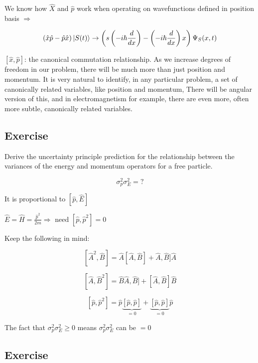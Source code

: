\documentclass{article}
\begin{document}
We know how $\hat{X}$ and $\hat{p}$ work when operating on wavefunctions defined in position basis $\Longrightarrow$

$$\left( \hat{x} \hat{p} - \hat{p} \hat{x} \right) \ket{S(t)} \rightarrow \left( s \left( -i \hbar \frac{d}{dx} \right) - \left(- i \hbar \frac{d}{dx} \right) x \right) \Psi_S(x,t)$$

$[\hat{x}, \hat{p}]$: the canonical commutation relationship. As we increase degrees of freedom in our problem, there will be much more than just position and momentum. It is very natural to identify, in any particular problem, a set of canonically related variables, like position and momentum, There will be angular version of this, and in electromagnetism for example, there are even more, often more subtle, canonically related variables. 




\subsection{Exercise}

Derive the uncertainty principle prediction for the relationship between the variances of the energy and momentum operators for a free particle. 

$$\sigma_p^2 \sigma_E^2 = ?$$

It is proportional to $[\hat{p}, \hat{E}]$

$\hat{E} = \hat{H} = \frac{\hat{p}^2}{2m} \Rightarrow \text{ need } [\hat{p}, \hat{p}^2] = 0$

Keep the following in mind:

$$[\hat{A}^2, \hat{B}] = \hat{A} [\hat{A}, \hat{B}] + \hat{A}, \hat{B}] \hat{A}$$

$$[\hat{A}, \hat{B}^2] = \hat{B} \hat{A}, \hat{B}] + [\hat{A}, \hat{B}] \hat{B}$$

$$[\hat{p}, \hat{p}^2] = \hat{p} \underbrace{[\hat{p}, \hat{p}]}_{ = 0} + \underbrace{[\hat{p}, \hat{p}]}_{= 0} \hat{p}$$

The fact that $\sigma_p^2 \sigma_E^2 \geq 0$ means $\sigma_p^2 \sigma_E^2$ can be $=0$

\subsection{Exercise}
\end{document}
